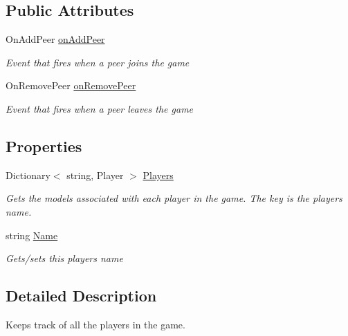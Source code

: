 \subsection*{Public Attributes}
\begin{DoxyCompactItemize}
\item 
On\+Add\+Peer \hyperlink{class_player_manager_a547dd0727a139061c67ffdadd6f8e99c}{on\+Add\+Peer}
\begin{DoxyCompactList}\small\item\em Event that fires when a peer joins the game \end{DoxyCompactList}\item 
On\+Remove\+Peer \hyperlink{class_player_manager_a88f01e2ed833375b7b95ae3d1272baf0}{on\+Remove\+Peer}
\begin{DoxyCompactList}\small\item\em Event that fires when a peer leaves the game \end{DoxyCompactList}\end{DoxyCompactItemize}
\subsection*{Properties}
\begin{DoxyCompactItemize}
\item 
Dictionary$<$ string, Player $>$ \hyperlink{class_player_manager_a6fcc25b412f01d734a22624aa2d3e016}{Players}
\begin{DoxyCompactList}\small\item\em Gets the models associated with each player in the game. The key is the player\textquotesingle{}s name. \end{DoxyCompactList}\item 
string \hyperlink{class_player_manager_acf881bd65193d0c3b7089f014ae22057}{Name}
\begin{DoxyCompactList}\small\item\em Gets/sets this player\textquotesingle{}s name \end{DoxyCompactList}\end{DoxyCompactItemize}


\subsection{Detailed Description}
Keeps track of all the players in the game. 




